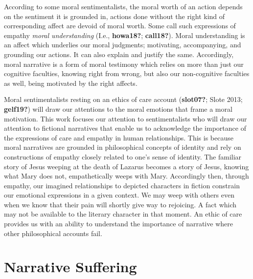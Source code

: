 \documentclass[12pt]{book}
\theoremstyle{definition}
\theoremstyle{remark}
\begin{document}
According to some moral sentimentalists, the moral worth of an action depends on the sentiment it is grounded in, actions done without the right kind of corresponding affect are devoid of moral worth. Some call such expressions of empathy \emph{moral understanding} (I.e., \textbf{howa18?}; \textbf{call18?}). Moral understanding is an affect which underlies our moral judgments; motivating, accompanying, and grounding our actions. It can also explain and justify the same. Accordingly, moral narrative is a form of moral testimony which relies on more than just our cognitive faculties, knowing right from wrong, but also our non-cognitive faculties as well, being motivated by the right affects.

Moral sentimentalists resting on an ethics of care account (\textbf{slot07?}; Slote 2013; \textbf{gelf19?}) will draw our attentions to the moral emotions that frame a moral motivation. This work focuses our attention to sentimentalists who will draw our attention to fictional narratives that enable us to acknowledge the importance of the expressions of care and empathy in human relationships. This is because moral narratives are grounded in philosophical concepts of identity and rely on constructions of empathy closely related to one's sense of identity. The familiar story of Jesus weeping at the death of Lazarus becomes a story of Jesus, knowing what Mary does not, empathetically weeps with Mary. Accordingly then, through empathy, our imagined relationships to depicted characters in fiction constrain our emotional expressions in a given context. We may weep with others even when we know that their pain will shortly give way to rejoicing. A fact which may not be available to the literary character in that moment. An ethic of care provides us with an ability to understand the importance of narrative where other philosophical accounts fail.

\section{Narrative Suffering}\label{narrative-suffering}
\end{document}
